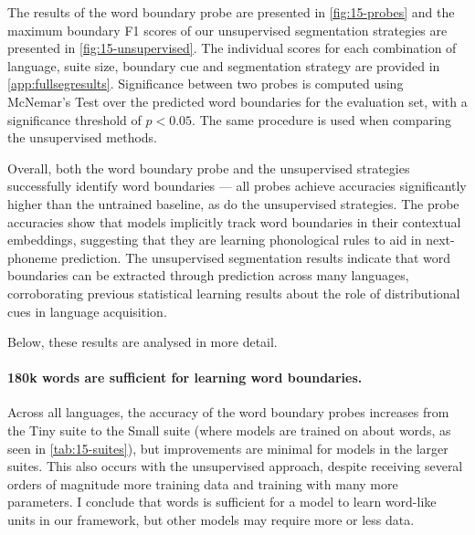 
The results of the word boundary probe are presented in \cref{fig:15-probes} and the maximum boundary F1 scores of our unsupervised segmentation strategies are presented in \cref{fig:15-unsupervised}. The individual scores for each combination of language, suite size, boundary cue and segmentation strategy are provided in \cref{app:fullsegresults}. Significance between two probes is computed using McNemar's Test \citep{McNemar_1947} over the predicted word boundaries for the evaluation set, with a significance threshold of $p<0.05$. The same procedure is used when comparing the unsupervised methods.

Overall, both the word boundary probe and the unsupervised strategies successfully identify word boundaries --- all probes achieve accuracies significantly higher than the untrained baseline, as do the unsupervised strategies. The probe accuracies show that models implicitly track word boundaries in their contextual embeddings, suggesting that they are learning phonological rules to aid in next-phoneme prediction. The unsupervised segmentation results indicate that word boundaries can be extracted through prediction across many languages, corroborating previous statistical learning results about the role of distributional cues in language acquisition.

Below, these results are analysed in more detail.

\paragraph{180k words are sufficient for learning word boundaries.}
Across all languages, the accuracy of the word boundary probes increases from the Tiny suite to the Small suite (where models are trained on about  words, as seen in \cref{tab:15-suites}), but improvements are minimal for models in the larger suites. This also occurs with the unsupervised approach, despite receiving several orders of magnitude more training data and training with many more parameters. I conclude that  words is sufficient for a model to learn word-like units in our framework, but other models may require more or less data. 

